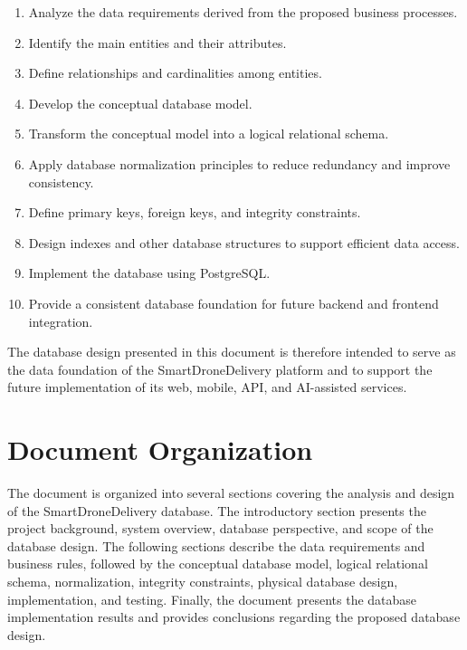 \begin{enumerate}
\item Analyze the data requirements derived from the proposed business processes.
\item Identify the main entities and their attributes.
\item Define relationships and cardinalities among entities.
\item Develop the conceptual database model.
\item Transform the conceptual model into a logical relational schema.
\item Apply database normalization principles to reduce redundancy and improve consistency.
\item Define primary keys, foreign keys, and integrity constraints.
\item Design indexes and other database structures to support efficient data access.
\item Implement the database using PostgreSQL.
\item Provide a consistent database foundation for future backend and frontend integration.
\end{enumerate}

The database design presented in this document is therefore intended to serve as the data foundation of the SmartDroneDelivery platform and to support the future implementation of its web, mobile, API, and AI-assisted services.
\section{Document Organization} 

\qquad The document is organized into several sections covering the analysis and design of the SmartDroneDelivery database.
The introductory section presents the project background, system overview, database perspective, and scope of the database design.
The following sections describe the data requirements and business rules, followed by the conceptual database model, logical relational schema, normalization, integrity constraints, physical database design, implementation, and testing.
Finally, the document presents the database implementation results and provides conclusions regarding the proposed database design.

